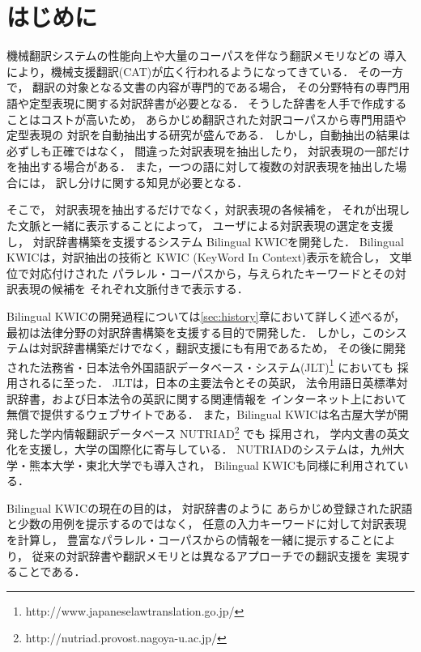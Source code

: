 \documentclass[japanese]{jnlp_1.4}
\begin{document}
\maketitle


\section{はじめに}
\label{sec:introduction}

機械翻訳システムの性能向上や大量のコーパスを伴なう翻訳メモリなどの
導入により，機械支援翻訳(CAT)が広く行われるようになってきている．
その一方で，
翻訳の対象となる文書の内容が専門的である場合，
その分野特有の専門用語や定型表現に関する対訳辞書が必要となる．
そうした辞書を人手で作成することはコストが高いため，
あらかじめ翻訳された対訳コーパスから専門用語や定型表現の
対訳を自動抽出する研究が盛んである\cite{Matsumoto00}．
しかし，自動抽出の結果は必ずしも正確ではなく，
間違った対訳表現を抽出したり，
対訳表現の一部だけを抽出する場合がある．
また，一つの語に対して複数の対訳表現を抽出した場合には，
訳し分けに関する知見が必要となる．

そこで，
対訳表現を抽出するだけでなく，対訳表現の各候補を，
それが出現した文脈と一緒に表示することによって，
ユーザによる対訳表現の選定を支援し，
対訳辞書構築を支援するシステム Bilingual KWIC\textsuperscript{\textregistered}を開発した．
Bilingual KWICは，対訳抽出の技術と
KWIC (KeyWord In Context)表示\cite{luhn1960}を統合し，
文単位で対応付けされた
パラレル・コーパスから，与えられたキーワードとその対訳表現の候補を
それぞれ文脈付きで表示する．

Bilingual KWICの開発過程については\ref{sec:history}章において詳しく述べるが，
最初は法律分野の対訳辞書構築を支援する目的で開発した．
しかし，このシステムは対訳辞書構築だけでなく，翻訳支援にも有用であるため，
その後に開発された法務省・日本法令外国語訳データベース・システム(JLT){\footnote{http://www.japaneselawtranslation.go.jp/} \cite{Toyama12}}においても
採用されるに至った．
JLTは，日本の主要法令とその英訳，
法令用語日英標準対訳辞書，および日本法令の英訳に関する関連情報を
インターネット上において無償で提供するウェブサイトである．
また，Bilingual KWICは名古屋大学が開発した学内情報翻訳データベース 
NUTRIAD\footnote{http://nutriad.provost.nagoya-u.ac.jp/} \cite{Fukuda}でも
採用され，
学内文書の英文化を支援し，大学の国際化に寄与している．
NUTRIADのシステムは，九州大学・熊本大学・東北大学でも導入され，
Bilingual KWICも同様に利用されている．

Bilingual KWICの現在の目的は，
対訳辞書のように
あらかじめ登録された訳語と少数の用例を提示するのではなく，
任意の入力キーワードに対して対訳表現を計算し，
豊富なパラレル・コーパスからの情報を一緒に提示することにより，
従来の対訳辞書や翻訳メモリとは異なるアプローチでの翻訳支援を
実現することである．
\end{document}
